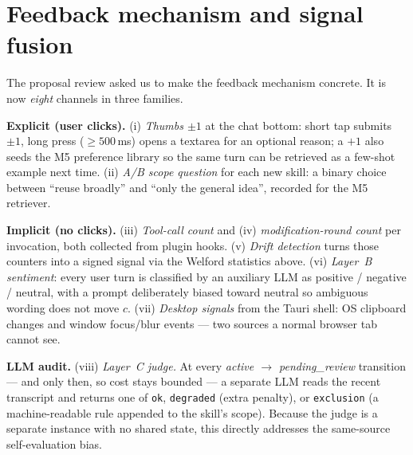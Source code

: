 \documentclass[12pt,a4paper]{article}
\theoremstyle{plain}
\theoremstyle{definition}
\theoremstyle{remark}
\begin{document}
			\section{Feedback mechanism and signal fusion}\label{sec:fb}

			The proposal review asked us to make the feedback mechanism concrete. It is now \emph{eight} channels in three families.

			\textbf{Explicit (user clicks).} (i) \emph{Thumbs $\pm 1$} at the chat bottom: short tap submits ${\pm}1$, long press ($\geq 500$\,ms) opens a textarea for an optional reason; a $+1$ also seeds the M5 preference library so the same turn can be retrieved as a few-shot example next time. (ii) \emph{A/B scope question} for each new skill: a binary choice between ``reuse broadly'' and ``only the general idea'', recorded for the M5 retriever.

			\textbf{Implicit (no clicks).} (iii) \emph{Tool-call count} and (iv) \emph{modification-round count} per invocation, both collected from plugin hooks. (v) \emph{Drift detection} turns those counters into a signed signal via the Welford statistics above. (vi) \emph{Layer~B sentiment}: every user turn is classified by an auxiliary LLM as positive / negative / neutral, with a prompt deliberately biased toward neutral so ambiguous wording does not move $c$. (vii) \emph{Desktop signals} from the Tauri shell: OS clipboard changes and window focus/blur events --- two sources a normal browser tab cannot see.

			\textbf{LLM audit.} (viii) \emph{Layer~C judge.} At every \emph{active $\rightarrow$ pending\_review} transition --- and only then, so cost stays bounded --- a separate LLM reads the recent transcript and returns one of \texttt{ok}, \texttt{degraded} (extra penalty), or \texttt{exclusion} (a machine-readable rule appended to the skill's scope). Because the judge is a separate instance with no shared state, this directly addresses the same-source self-evaluation bias.
\end{document}
